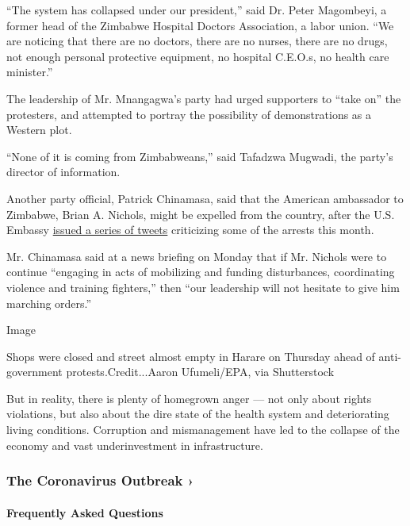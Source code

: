 ``The system has collapsed under our president,'' said Dr. Peter
Magombeyi, a former head of the Zimbabwe Hospital Doctors Association, a
labor union. ``We are noticing that there are no doctors, there are no
nurses, there are no drugs, not enough personal protective equipment, no
hospital C.E.O.s, no health care minister.''

The leadership of Mr. Mnangagwa's party had urged supporters to ``take
on'' the protesters, and attempted to portray the possibility of
demonstrations as a Western plot.

``None of it is coming from Zimbabweans,'' said Tafadzwa Mugwadi, the
party's director of information.

Another party official, Patrick Chinamasa, said that the American
ambassador to Zimbabwe, Brian A. Nichols, might be expelled from the
country, after the U.S. Embassy
\href{https://twitter.com/usembassyharare/status/1285856222579699713?s=20}{issued
a series of tweets} criticizing some of the arrests this month.

Mr. Chinamasa said at a news briefing on Monday that if Mr. Nichols were
to continue ``engaging in acts of mobilizing and funding disturbances,
coordinating violence and training fighters,'' then ``our leadership
will not hesitate to give him marching orders.''

Image

Shops were closed and street almost empty in Harare on Thursday ahead of
anti-government protests.Credit...Aaron Ufumeli/EPA, via Shutterstock

But in reality, there is plenty of homegrown anger --- not only about
rights violations, but also about the dire state of the health system
and deteriorating living conditions. Corruption and mismanagement have
led to the collapse of the economy and vast underinvestment in
infrastructure.

\href{https://www.nytimes.com/news-event/coronavirus?action=click\&pgtype=Article\&state=default\&region=MAIN_CONTENT_3\&context=storylines_faq}{}

\hypertarget{the-coronavirus-outbreak-}{%
\subsubsection{The Coronavirus Outbreak
›}\label{the-coronavirus-outbreak-}}

\hypertarget{frequently-asked-questions}{%
\paragraph{Frequently Asked
Questions}\label{frequently-asked-questions}}

